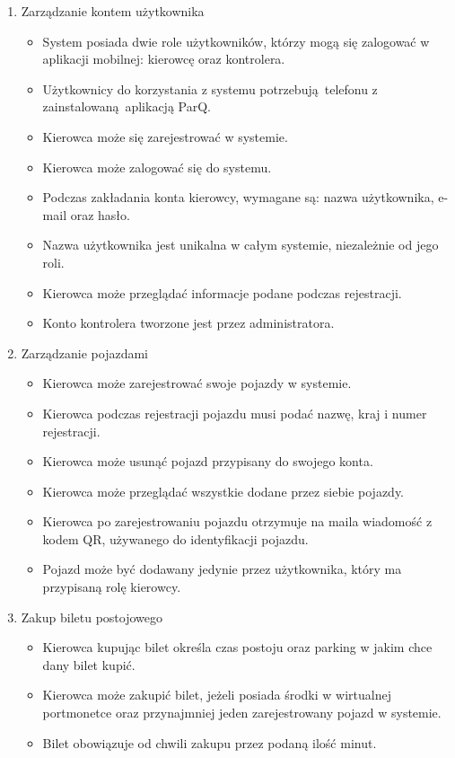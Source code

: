 \begin{enumerate}
	\item Zarządzanie kontem użytkownika
		\begin{itemize}
			\item System posiada dwie role użytkowników, którzy mogą się zalogować w aplikacji mobilnej: kierowcę oraz kontrolera.
			\item Użytkownicy do korzystania z systemu potrzebują telefonu z zainstalowaną aplikacją ParQ.
			\item Kierowca może się zarejestrować w systemie.
			\item Kierowca może zalogować się do systemu.
			\item Podczas zakładania konta kierowcy, wymagane są: nazwa użytkownika, e-mail oraz hasło.
			\item Nazwa użytkownika jest unikalna w całym systemie, niezależnie od jego roli.
			\item Kierowca może przeglądać informacje podane podczas rejestracji.
			\item Konto kontrolera tworzone jest przez administratora.
		\end{itemize}
\newpage
	\item Zarządzanie pojazdami
		\begin{itemize}
			\item Kierowca może zarejestrować swoje pojazdy w systemie.
			\item Kierowca podczas rejestracji pojazdu musi podać nazwę, kraj i numer rejestracji.
			\item Kierowca może usunąć pojazd przypisany do swojego konta.
			\item Kierowca może przeglądać wszystkie dodane przez siebie pojazdy.
			\item Kierowca po zarejestrowaniu pojazdu otrzymuje na maila wiadomość z kodem QR, używanego do identyfikacji pojazdu.
			\item Pojazd może być dodawany jedynie przez użytkownika, który ma przypisaną rolę kierowcy.
		\end{itemize}
	\item Zakup biletu postojowego
		\begin{itemize}
			\item Kierowca kupując bilet określa czas postoju oraz parking w jakim chce dany bilet kupić.
			\item Kierowca może zakupić bilet, jeżeli posiada środki w wirtualnej portmonetce oraz przynajmniej jeden zarejestrowany pojazd w systemie.
			\item Bilet obowiązuje od chwili zakupu przez podaną ilość minut.

\end{itemize}
\end{enumerate}
